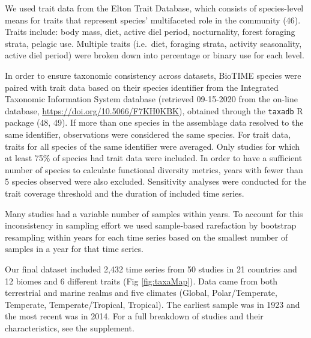 \documentclass{article}
\begin{document}
We used trait data from the Elton Trait Database, which consists of
species-level means for traits that represent species' multifaceted role
in the community (46). Traits include: body mass, diet, active diel
period, nocturnality, forest foraging strata, pelagic use. Multiple
traits (i.e.~diet, foraging strata, activity seasonality, active diel
period) were broken down into percentage or binary use for each level.

In order to ensure taxonomic consistency across datasets, BioTIME
species were paired with trait data based on their species identifier
from the Integrated Taxonomic Information System database (retrieved
09-15-2020 from the on-line database,
\url{https://doi.org/10.5066/F7KH0KBK}), obtained through the
\texttt{taxadb} R package (48, 49). If more than one species in the
assemblage data resolved to the same identifier, observations were
considered the same species. For trait data, traits for all species of
the same identifier were averaged. Only studies for which at least 75\%
of species had trait data were included. In order to have a sufficient
number of species to calculate functional diversity metrics, years with
fewer than 5 species observed were also excluded. Sensitivity analyses
were conducted for the trait coverage threshold and the duration of
included time series.

Many studies had a variable number of samples within years. To account
for this inconsistency in sampling effort we used sample-based
rarefaction by bootstrap resampling within years for each time series
based on the smallest number of samples in a year for that time series.

Our final dataset included 2,432 time series from 50 studies in 21
countries and 12 biomes and 6 different traits (Fig \ref{fig:taxaMap}).
Data came from both terrestrial and marine realms and five climates
(Global, Polar/Temperate, Temperate, Temperate/Tropical, Tropical). The
earliest sample was in 1923 and the most recent was in 2014. For a full
breakdown of studies and their characteristics, see the supplement.
\end{document}
